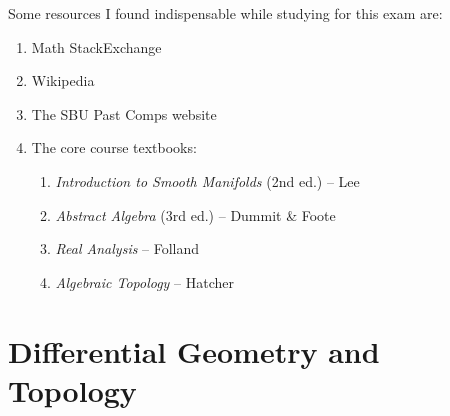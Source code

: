 \documentclass{article}
\begin{document}
	Some resources I found indispensable while studying for this exam are: 
	\begin{enumerate}[itemsep =-2pt,label = (\arabic{*})]
		\item Math StackExchange 
		\item Wikipedia
		\item The SBU Past Comps website 
		\item The core course textbooks: \vspace{-0.25cm}
			\begin{enumerate}[itemsep =-2pt,label = (\roman{*})]
				\item \textit{Introduction to Smooth Manifolds} (2nd ed.) -- Lee
				\item \textit{Abstract Algebra} (3rd ed.) -- Dummit \& Foote
				\item \textit{Real Analysis} -- Folland 
				\item \textit{Algebraic Topology} -- Hatcher
			\end{enumerate}
	\end{enumerate}
	\newpage 
	\section{Differential Geometry and Topology}
\end{document}
